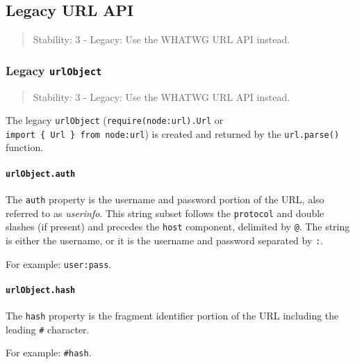 \subsection{Legacy URL API}\label{legacy-url-api}

\begin{quote}
Stability: 3 - Legacy: Use the WHATWG URL API instead.
\end{quote}

\subsubsection{\texorpdfstring{Legacy
\texttt{urlObject}}{Legacy urlObject}}\label{legacy-urlobject}

\begin{quote}
Stability: 3 - Legacy: Use the WHATWG URL API instead.
\end{quote}

The legacy \texttt{urlObject}
(\texttt{require(\textquotesingle{}node:url\textquotesingle{}).Url} or
\texttt{import\ \{\ Url\ \}\ from\ \textquotesingle{}node:url\textquotesingle{}})
is created and returned by the \texttt{url.parse()} function.

\paragraph{\texorpdfstring{\texttt{urlObject.auth}}{urlObject.auth}}\label{urlobject.auth}

The \texttt{auth} property is the username and password portion of the
URL, also referred to as \emph{userinfo}. This string subset follows the
\texttt{protocol} and double slashes (if present) and precedes the
\texttt{host} component, delimited by \texttt{@}. The string is either
the username, or it is the username and password separated by
\texttt{:}.

For example: \texttt{\textquotesingle{}user:pass\textquotesingle{}}.

\paragraph{\texorpdfstring{\texttt{urlObject.hash}}{urlObject.hash}}\label{urlobject.hash}

The \texttt{hash} property is the fragment identifier portion of the URL
including the leading \texttt{\#} character.

For example: \texttt{\textquotesingle{}\#hash\textquotesingle{}}.

